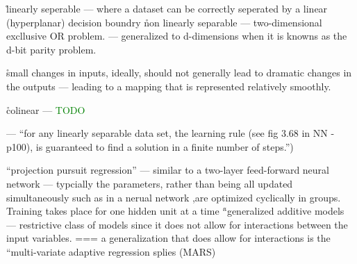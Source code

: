 \r{linearly seperable --- where a dataset can be correctly seperated by a linear (hyperplanar) decision boundry}
\r{non linearly separable --- two-dimensional excllusive OR problem. --- generalized to d-dimensions when it is knowns as the d-bit parity problem.}

\r{small changes in inputs, ideally, should not generally lead to dramatic changes in the outputs --- leading to a mapping that is represented relatively smoothly.}

\r{colinear --- \textcolor{green}{TODO}}


\r{ --- ``for any linearly separable data set, the learning rule (see fig 3.68 in NN - p100), is guaranteed to find a solution in a finite number of steps.'')}


\r{``projection pursuit regression'' --- similar to a two-layer feed-forward neural network --- typcially the parameters, rather than being all updated simultaneously such as in a nerual network ,are optimized cyclically in groups. Training takes place for one hidden unit at a time}
\r{``generalized additive models  --- restrictive class of models since it does not allow for interactions between the input variables. === a generalization that does allow for interactions is the ``multi-variate adaptive regression splies (MARS) }









